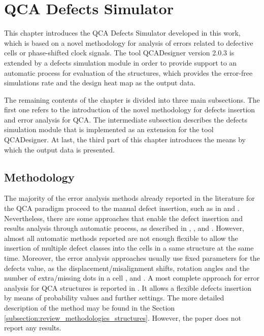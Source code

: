 \chapter{QCA Defects Simulator}
\label{QCA_Defects_Simulator}

This chapter introduces the QCA Defects Simulator developed in this work, which is based on a novel methodology for analysis of errors related to defective cells or phase-shifted clock signals. The tool QCADesigner version 2.0.3 is extended by a defects simulation module in order to provide support to an automatic process for evaluation of the structures, which provides the error-free simulations rate and the design heat map as the output data.

The remaining contents of the chapter is divided into three main subsections. The first one refers to the introduction of the novel methodology for defects insertion and error analysis for QCA. The intermediate subsection describes the defects simulation module that is implemented as an extension for the tool QCADesigner. At last, the third part of this chapter introduces the means by which the output data is presented.

\section{Methodology}

The majority of the error analysis methods already reported in the literature for the QCA paradigm proceed to the manual defect insertion, such as in \cite{tahoori04} \cite{dai10} and \cite{yang12}. Nevertheless, there are some approaches that enable the defect insertion and results analysis through automatic process, as described in \cite{armstrong03}, , \cite{khatun06} and \cite{karim09}. However, almost all automatic methods reported are not enough flexible to allow the insertion of multiple defect classes into the cells in a same structure at the same time. Moreover, the error analysis approaches usually use fixed parameters for the defects value, as the displacement/misalignment shifts, rotation angles and the number of extra/missing dots in a cell \cite{tahoori04}, \cite{dai10} and \cite{yang12}. A most complete approach for error analysis for QCA structures is reported in \cite{armstrong03}. It allows a flexible defects insertion by means of probability values and further settings. The more detailed description of the method may be found in the Section \ref{subsection:review_methodologies_structures}. However, the paper does not report any results.

